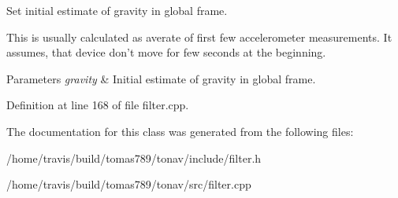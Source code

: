 Set initial estimate of gravity in global frame. 

This is usually calculated as averate of first few accelerometer measurements. It assumes, that device don't move for few seconds at the beginning.


\begin{DoxyParams}{Parameters}
{\em gravity} & Initial estimate of gravity in global frame. \\
\hline
\end{DoxyParams}


Definition at line 168 of file filter.\-cpp.



The documentation for this class was generated from the following files\-:\begin{DoxyCompactItemize}
\item 
/home/travis/build/tomas789/tonav/include/filter.\-h\item 
/home/travis/build/tomas789/tonav/src/filter.\-cpp\end{DoxyCompactItemize}
